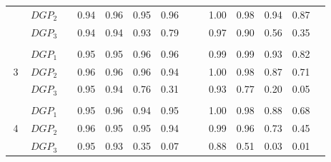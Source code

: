 \begin{table}[htbp]
{\begin{tabular}{cc|ccccccc|cccccc|}
    \multicolumn{2}{c|}{} & \multicolumn{1}{l}{$DGP_{2}$} & & \multicolumn{1}{c}{0.94} & \multicolumn{1}{c}{0.96} & \multicolumn{1}{c}{0.95} & \multicolumn{1}{c}{0.96} & & & \multicolumn{1}{c}{1.00} & \multicolumn{1}{c}{0.98} & \multicolumn{1}{c}{0.94} & \multicolumn{1}{c}{0.87} & \\
    \multicolumn{2}{c|}{} & \multicolumn{1}{l}{$DGP_{3}$} & & \multicolumn{1}{c}{0.94} & \multicolumn{1}{c}{0.94} & \multicolumn{1}{c}{0.93} & \multicolumn{1}{c}{0.79} & & & \multicolumn{1}{c}{0.97} & \multicolumn{1}{c}{0.90} & \multicolumn{1}{c}{0.56} & \multicolumn{1}{c}{0.35} & \\
    & & & & & & & & & & & & & & \\
    \multicolumn{2}{c|}{\multirow{3}{*}{3}} & \multicolumn{1}{l}{$DGP_{1}$} & & \multicolumn{1}{c}{0.95} & \multicolumn{1}{c}{0.95} & \multicolumn{1}{c}{0.96} & \multicolumn{1}{c}{0.96} & & & \multicolumn{1}{c}{0.99} & \multicolumn{1}{c}{0.99} & \multicolumn{1}{c}{0.93} & \multicolumn{1}{c}{0.82} & \\
    \multicolumn{2}{c|}{} & \multicolumn{1}{l}{$DGP_{2}$} & & \multicolumn{1}{c}{0.96} & \multicolumn{1}{c}{0.96} & \multicolumn{1}{c}{0.96} & \multicolumn{1}{c}{0.94} & & & \multicolumn{1}{c}{1.00} & \multicolumn{1}{c}{0.98} & \multicolumn{1}{c}{0.87} & \multicolumn{1}{c}{0.71} & \\
    \multicolumn{2}{c|}{} & \multicolumn{1}{l}{$DGP_{3}$} & & \multicolumn{1}{c}{0.95} & \multicolumn{1}{c}{0.94} & \multicolumn{1}{c}{0.76} & \multicolumn{1}{c}{0.31} & & & \multicolumn{1}{c}{0.93} & \multicolumn{1}{c}{0.77} & \multicolumn{1}{c}{0.20} & \multicolumn{1}{c}{0.05} & \\
    & & & & & & & & & & & & & & \\
    \multicolumn{2}{c|}{\multirow{3}{*}{4}} & \multicolumn{1}{l}{$DGP_{1}$} & & \multicolumn{1}{c}{0.95} & \multicolumn{1}{c}{0.96} & \multicolumn{1}{c}{0.94} & \multicolumn{1}{c}{0.95} & & & \multicolumn{1}{c}{1.00} & \multicolumn{1}{c}{0.98} & \multicolumn{1}{c}{0.88} & \multicolumn{1}{c}{0.68} & \\
    \multicolumn{2}{c|}{} & \multicolumn{1}{l}{$DGP_{2}$} & & \multicolumn{1}{c}{0.96} & \multicolumn{1}{c}{0.95} & \multicolumn{1}{c}{0.95} & \multicolumn{1}{c}{0.94} & & & \multicolumn{1}{c}{0.99} & \multicolumn{1}{c}{0.96} & \multicolumn{1}{c}{0.73} & \multicolumn{1}{c}{0.45} & \\
    \multicolumn{2}{c|}{} & \multicolumn{1}{l}{$DGP_{3}$} & & \multicolumn{1}{c}{0.95} & \multicolumn{1}{c}{0.93} & \multicolumn{1}{c}{0.35} & \multicolumn{1}{c}{0.07} & & & \multicolumn{1}{c}{0.88} & \multicolumn{1}{c}{0.51} & \multicolumn{1}{c}{0.03} & \multicolumn{1}{c}{0.01} & \\

\end{tabular}}
\end{table}
